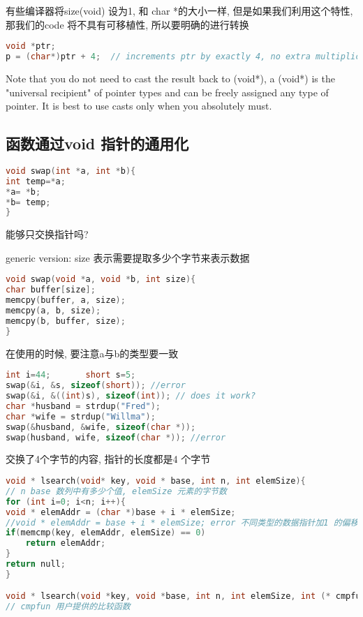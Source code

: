 \documentclass{article}
\begin{document}
有些编译器将size(void) 设为1, 和 char *的大小一样, 但是如果我们利用这个特性, 那我们的code 将不具有可移植性, 所以要明确的进行转换

\begin{lstlisting}[language = C]
void *ptr;
p = (char*)ptr + 4;  // increments ptr by exactly 4, no extra multiplication
\end{lstlisting}
Note that you do not need to cast the result back to (void*), a (void*) is the "universal
recipient" of pointer types and can be freely assigned any type of pointer.  It is best to
use casts only when you absolutely must.

\subsection{函数通过void 指针的通用化}
\begin{lstlisting}[language = C]
void swap(int *a, int *b){
int temp=*a;
*a= *b;
*b= temp;
}
\end{lstlisting}
能够只交换指针吗?

generic version: size 表示需要提取多少个字节来表示数据
\begin{lstlisting}[language = C]
void swap(void *a, void *b, int size){
char buffer[size];
memcpy(buffer, a, size);
memcpy(a, b, size);
memcpy(b, buffer, size);
}
\end{lstlisting}
在使用的时候, 要注意a与b的类型要一致
\begin{lstlisting}[language = C]
int i=44;      	short s=5;
swap(&i, &s, sizeof(short)); //error
swap(&i, &((int)s), sizeof(int)); // does it work?
char *husband = strdup("Fred");
char *wife = strdup("Willma");
swap(&husband, &wife, sizeof(char *));
swap(husband, wife, sizeof(char *)); //error
\end{lstlisting}
交换了4个字节的内容, 指针的长度都是4 个字节

\begin{lstlisting}[language = C]
void * lsearch(void* key, void * base, int n, int elemSize){
// n base 数列中有多少个值, elemSize 元素的字节数
for (int i=0; i<n; i++){
void * elemAddr = (char *)base + i * elemSize;	
//void * elemAddr = base + i * elemSize; error 不同类型的数据指针加1 的偏移量不一样
if(memcmp(key, elemAddr, elemSize) == 0)
	return elemAddr;
}
return null;
}

void * lsearch(void *key, void *base, int n, int elemSize, int (* cmpfun)(void *, void *))
// cmpfun 用户提供的比较函数
\end{lstlisting}
\end{document}
